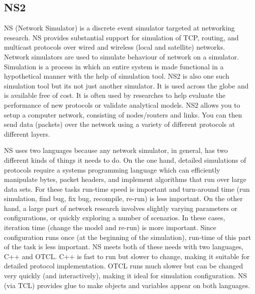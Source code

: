 \documentclass[MTech]{iitmdiss}
\begin{document}
\subsection{NS2}
NS (Network Simulator) is a discrete event simulator targeted at networking research. 
NS provides substantial support for simulation of TCP, routing, and multicast protocols over 
wired and wireless (local and satellite) networks. Network simulators are used to simulate 
behaviour  of network on a simulator. Simulation is a process in which an entire system 
is made functional in a hypothetical  manner with the help of simulation tool. NS2 is 
also one such simulation tool but its not just another simulator. It is used across the 
globe and is available free of cost. It is often used by researches to help evaluate the 
performance of new protocols  or validate analytical models. NS2 allows you to setup a 
computer network, consisting of nodes/routers and links. You can then send data (packets) 
over the network using a variety of different protocols at different layers.


NS uses two languages because  any network simulator, in general, has two different 
kinds of things it needs to do. On the one hand, detailed simulations of protocols require a 
systems programming language which can efficiently manipulate bytes, packet headers, and 
implement algorithms  that run over large data sets. For these tasks run-time speed is 
important and turn-around time (run simulation, find bug, fix bug, recompile, re-run) is less 
important. On the other hand, a large part of network research involves slightly varying 
parameters or configurations, or quickly exploring a number of scenarios. In these cases, 
iteration time (change the model and re-run) is more important. Since configuration runs once 
(at the beginning of the simulation), run-time of this part of the task is less  important. NS 
meets both of these needs with two languages, C++ and OTCL. C++ is fast to run but slower 
to change, making it suitable for detailed protocol implementation. OTCL runs much slower 
but can be changed very quickly (and interactively), making it  ideal for simulation 
configuration. NS (via TCL) provides glue to make objects and variables appear on both 
languages. 
\end{document}
